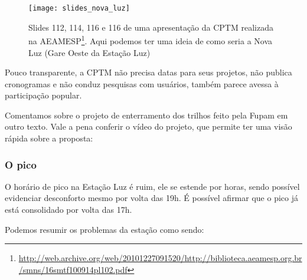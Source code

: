 \documentclass[11pt,fleqn]{book} %
\begin{document}
\begin{landscape}
\begin{figure}[htb]
	\caption[Nova Luz conforme slides da CPTM para a AEAMESP]{Slides 112, 114, 116 e 116 de uma apresentação da CPTM realizada na AEAMESP\footnote{\url{http://web.archive.org/web/20101227091520/http://biblioteca.aeamesp.org.br/smns/16smtf100914pl102.pdf}}. Aqui podemos ter uma ideia de como seria a Nova Luz (Gare Oeste da Estação Luz)}
	\centering
	\texttt{[image: slides\_nova\_luz]}
	\label{fig:slides_nova_luz}
\end{figure}
\end{landscape}

Pouco transparente, a CPTM não precisa datas para seus projetos, não publica cronogramas e não conduz pesquisas com usuários, também parece avessa à participação popular.

Comentamos sobre o projeto de enterramento dos trilhos feito pela Fupam em outro texto. Vale a pena conferir o vídeo do projeto, que permite ter uma visão rápida sobre a proposta:


\subsubsection{O pico}

O horário de pico na Estação Luz é ruim, ele se estende por horas, sendo possível evidenciar desconforto mesmo por volta das 19h. É possível afirmar que o pico já está consolidado por volta das 17h.

Podemos resumir os problemas da estação como sendo:
\end{document}

